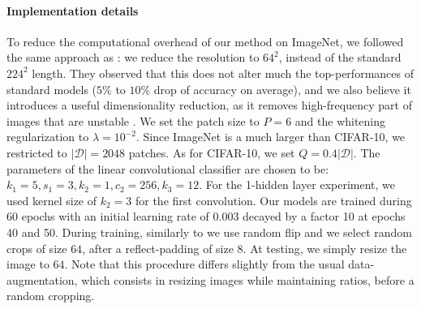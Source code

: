 \documentclass{article} %
\begin{document}


\paragraph{Implementation details} 
To reduce the computational overhead of our method on ImageNet, we followed the same approach as \cite{DBLP:journals/corr/ChrabaszczLH17}: we reduce the resolution to $64^2$, instead of the standard $224^2$ length.  They observed that this does not alter much the top-performances of standard models ($5 \%$ to $10\%$ drop of accuracy on average), and we also believe it introduces a useful dimensionality reduction, as it removes high-frequency part of images that are  unstable
\citep{mallat1999wavelet}. 
We set the patch size to $P=6$ and the whitening regularization to $\lambda=10^{-2}$. 
Since ImageNet is a much larger  than CIFAR-10, we restricted to $|\mathcal{D}|=2048$ patches. As for CIFAR-10, we set $Q=0.4 |\mathcal{D}|$. The parameters of the linear convolutional classifier are chosen to be: $k_1=5,s_1=3,k_2=1, c_2=256, k_3=12$. For the 1-hidden layer experiment, we used kernel size of $k_2=3$ for the first convolution.
Our models are trained during 60 epochs with an initial learning rate of 0.003 decayed by a factor 10 at epochs 40 and 50.
During training, similarly to \cite{DBLP:journals/corr/ChrabaszczLH17} we use random flip and we select random crops of size $64$, after a reflect-padding of size 8. At testing, we simply resize the image to $64$.
Note that this procedure differs slightly from the usual data-augmentation, which consists in resizing images while maintaining ratios, before a random cropping.
\end{document}
